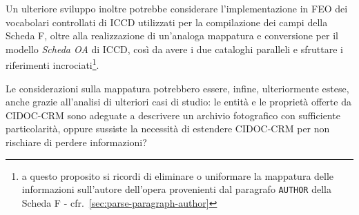 Un ulteriore sviluppo inoltre potrebbe considerare l'implementazione in FEO dei vocabolari controllati di ICCD utilizzati per la compilazione dei campi della Scheda F, oltre alla realizzazione di un'analoga mappatura e conversione per il modello \emph{Scheda OA} di ICCD, così da avere i due cataloghi paralleli e sfruttare i riferimenti incrociati\footnote{a questo proposito si ricordi di eliminare o uniformare la mappatura delle informazioni sull'autore dell'opera provenienti dal paragrafo \texttt{AUTHOR} della Scheda F - cfr.~\ref{sec:parse-paragraph-author}}.

Le considerazioni sulla mappatura potrebbero essere, infine, ulteriormente estese, anche grazie all'analisi di ulteriori casi di studio: le entità e le proprietà offerte da CIDOC-CRM sono adeguate a descrivere un archivio fotografico con sufficiente particolarità, oppure sussiste la necessità di estendere CIDOC-CRM per non rischiare di perdere informazioni?
